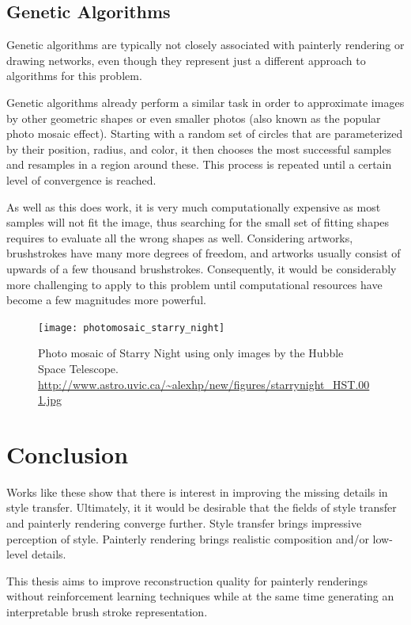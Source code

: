 \subsection{Genetic Algorithms}
Genetic algorithms are typically not closely associated with painterly rendering or drawing networks, even though they represent just a different approach to algorithms for this problem.

Genetic algorithms already perform a similar task in order to approximate images by other geometric shapes or even smaller photos (also known as the popular photo mosaic effect).
Starting with a random set of circles that are parameterized by their position, radius, and color, it then chooses the most successful samples and resamples in a region around these.
This process is repeated until a certain level of convergence is reached.


As well as this does work, it is very much computationally expensive as most samples will not fit the image, thus searching for the small set of fitting shapes requires to evaluate all the wrong shapes as well.
Considering artworks, brushstrokes have many more degrees of freedom, and artworks usually consist of upwards of a few thousand brushstrokes.
Consequently, it would be considerably more challenging to apply to this problem until computational resources have become a few magnitudes more powerful.

\begin{figure}
    \texttt{[image: photomosaic\_starry\_night]}
    \caption[]{Photo mosaic of Starry Night using only images by the Hubble Space Telescope. \url{http://www.astro.uvic.ca/~alexhp/new/figures/starrynight_HST.001.jpg}}
\end{figure}



\section{Conclusion}
Works like these show that there is interest in improving the missing details in style transfer.
Ultimately, it it would be desirable that the fields of style transfer and painterly rendering converge further.
Style transfer brings impressive perception of style.
Painterly rendering brings realistic composition and/or low-level details.

This thesis aims to improve reconstruction quality for painterly renderings without reinforcement learning techniques while at the same time generating an interpretable brush stroke representation.
